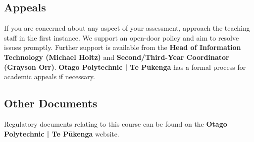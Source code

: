 \documentclass{article}
\begin{document}
\subsection*{Appeals}
If you are concerned about any aspect of your assessment, approach the teaching staff in the first instance. We support an open-door policy and aim to resolve issues promptly. Further support is available from the \textbf{Head of Information Technology (Michael Holtz)} and \textbf{Second/Third-Year Coordinator (Grayson Orr)}. \textbf{Otago Polytechnic | Te Pūkenga} has a formal process for academic appeals if necessary.

\subsection*{Other Documents}
Regulatory documents relating to this course can be found on the \textbf{Otago Polytechnic | Te Pūkenga} website.
\end{document}
